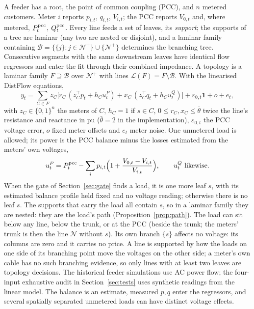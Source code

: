 \documentclass[journal,onecolumn,11pt]{IEEEtran}
\newcommand{\tp}{^{\top}}
\newcommand{\one}{\mathbf{1}}
\newcommand{\Lin}{\mathcal{L}}
\newcommand{\Nset}{\mathcal{N}}
\newcommand{\Bset}{\mathcal{B}}
\begin{document}
A feeder has a root, the point of common coupling (PCC), and $n$ metered customers. Meter $i$ reports $p_{i,t}$,
$q_{i,t}$, $V_{i,t}$; the PCC reports $V_{0,t}$ and, where metered, $P^{\rm pcc}_t$, $Q^{\rm pcc}_t$. Every line feeds a set
of leaves, its \emph{support}; the supports of a tree are laminar (any two are nested or disjoint), and a laminar family
containing $\Bset=\{\{j\}:j\in\Nset^+\}\cup\{\Nset^+\}$ determines the branching tree. Consecutive
segments with the same downstream leaves have identical flow regressors and enter the fit through their combined impedance. A topology is a laminar family $F\supseteq\Bset$ over $\Nset^+$ with lines $\Lin(F)=F\setminus\Bset$. With the
linearised DistFlow equations,
\begin{equation}\label{eq:model}
y_t=\sum_{C\in F} z_C\big[r_C\,(z_C\tp p_t+h_C u^P_t)+x_C\,(z_C\tp q_t+h_C u^Q_t)\big]+\varepsilon_{0,t}\one+o+e_t ,
\end{equation}
with $z_C\in\{0,1\}^n$ the meters of $C$, $h_C=1$ if $s\in C$, $0\le r_C,x_C\le\bar\theta$ twice the line's resistance and
reactance in pu ($\bar\theta=2$ in the implementation), $\varepsilon_{0,t}$ the PCC voltage error, $o$ fixed meter offsets and $e_t$
meter noise. One unmetered load is allowed; its power is the PCC balance minus the losses estimated from the meters' own
voltages,
\begin{equation}\label{eq:balance}
u^P_t=P^{\rm pcc}_t-\sum_i p_{i,t}\Big(1+\frac{V_{0,t}-V_{i,t}}{V_{i,t}}\Big),\qquad u^Q_t\ \text{likewise}.
\end{equation}
When the gate of Section~\ref{sec:gate} finds a load, it is one more leaf $s$, with its estimated balance profile held fixed and no voltage reading;
otherwise there is no leaf $s$. The supports that carry the load all contain $s$, so in a laminar family they are nested:
they are the load's path (Proposition~\ref{prop:path}). The load can sit below any line, below the trunk, or at the PCC
(beside the trunk; the meters' trunk is then the line $\Nset$ without $s$). Its own branch $\{s\}$ affects no voltage: its
columns are zero and it carries no price. A line is supported by how the loads on one side of its branching point move the
voltages on the other side; a meter's own cable has no such branching evidence, so only lines with at least two leaves are
topology decisions. The historical feeder simulations use AC power flow; the four-input exhaustive audit in
Section~\ref{sec:tests} uses synthetic readings from the linear model. The balance is an estimate, measured $p,q$
enter the regressors, and several spatially separated unmetered loads can have distinct voltage effects.
\end{document}
